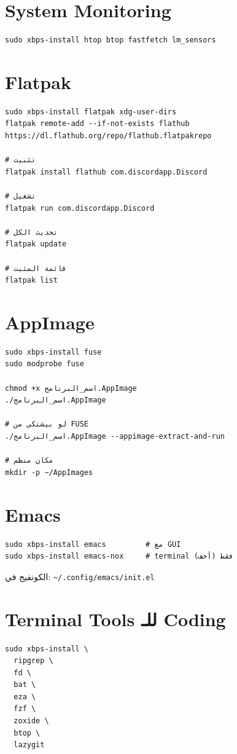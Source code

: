\documentclass[12pt, a4paper]{report}
\newcommand{\file}[1]{\texttt{\color{warn}#1}}
\begin{document}
\section{System Monitoring}
\begin{lstlisting}
sudo xbps-install htop btop fastfetch lm_sensors
\end{lstlisting}

\section{Flatpak}
\begin{lstlisting}
sudo xbps-install flatpak xdg-user-dirs
flatpak remote-add --if-not-exists flathub https://dl.flathub.org/repo/flathub.flatpakrepo

# تثبيت
flatpak install flathub com.discordapp.Discord

# تشغيل
flatpak run com.discordapp.Discord

# تحديث الكل
flatpak update

# قائمة المثبت
flatpak list
\end{lstlisting}

\section{AppImage}
\begin{lstlisting}
sudo xbps-install fuse
sudo modprobe fuse

chmod +x اسم_البرنامج.AppImage
./اسم_البرنامج.AppImage

# لو بيشتكي من FUSE
./اسم_البرنامج.AppImage --appimage-extract-and-run

# مكان منظم
mkdir -p ~/AppImages
\end{lstlisting}

\section{Emacs}
\begin{lstlisting}
sudo xbps-install emacs         # مع GUI
sudo xbps-install emacs-nox     # terminal فقط (أخف)
\end{lstlisting}
الكونفيج في: \file{\textasciitilde/.config/emacs/init.el}

\section{Terminal Tools للـ Coding}
\begin{lstlisting}
sudo xbps-install \
  ripgrep \
  fd \
  bat \
  eza \
  fzf \
  zoxide \
  btop \
  lazygit
\end{lstlisting}
\end{document}
